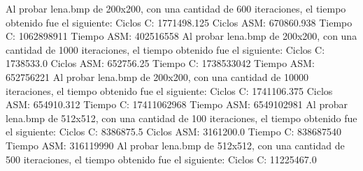 \documentclass[10pt, a4paper]{article}
\begin{document}
\begin{itemize}
Al probar lena.bmp de 200x200, con una cantidad de 600 iteraciones, el tiempo obtenido fue el siguiente:\newline
Ciclos C:                 1771498.125\newline
Ciclos ASM:               670860.938\newline
\newline
Tiempo C:                 1062898911\newline
Tiempo ASM:               402516558\newline
\newline
Al probar lena.bmp de 200x200, con una cantidad de 1000 iteraciones, el tiempo obtenido fue el siguiente:\newline
Ciclos C:                 1738533.0\newline
Ciclos ASM:               652756.25\newline
\newline
Tiempo C:                 1738533042\newline
Tiempo ASM:               652756221\newline
\newline
Al probar lena.bmp de 200x200, con una cantidad de 10000 iteraciones, el tiempo obtenido fue el siguiente:\newline
Ciclos C:                 1741106.375\newline
Ciclos ASM:               654910.312\newline
\newline
Tiempo C:                 17411062968\newline
Tiempo ASM:               6549102981\newline
\newline
Al probar lena.bmp de 512x512, con una cantidad de 100 iteraciones, el tiempo obtenido fue el siguiente:\newline
Ciclos C:                 8386875.5\newline
Ciclos ASM:               3161200.0\newline
\newline
Tiempo C:                 838687540\newline
Tiempo ASM:               316119990\newline
\newline
Al probar lena.bmp de 512x512, con una cantidad de 500 iteraciones, el tiempo obtenido fue el siguiente:\newline
Ciclos C:                 11225467.0\newline

\end{itemize}
\end{document}
